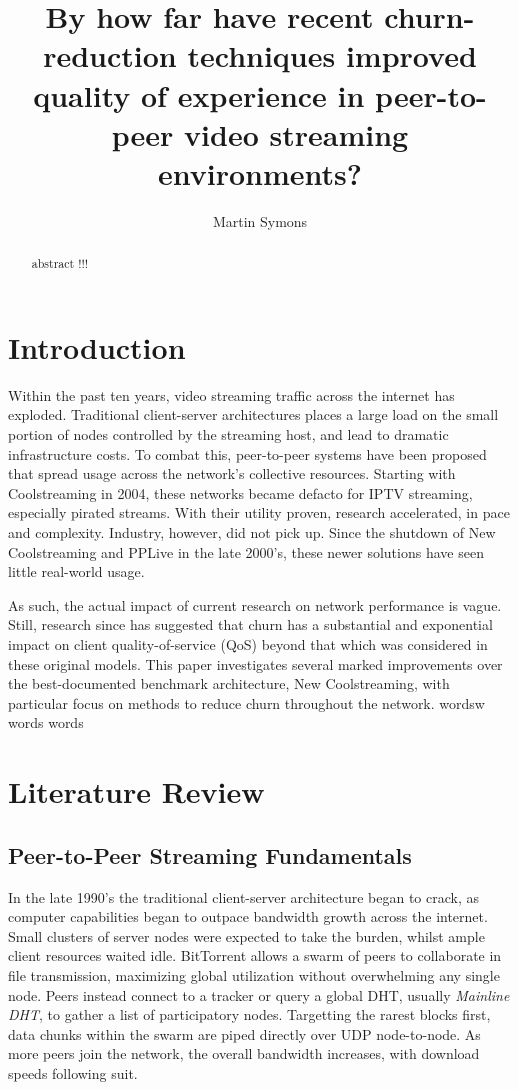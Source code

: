 \documentclass[]{article}
\title{By how far have recent churn-reduction techniques improved quality of experience in peer-to-peer video streaming environments?}
\author{Martin Symons}
\begin{document}
\maketitle

\begin{abstract}
abstract !!! 
\end{abstract}

\section{Introduction}
Within the past ten years, video streaming traffic across the internet has exploded. Traditional client-server architectures places a large load on the small portion of nodes controlled by the streaming host, and lead to dramatic infrastructure costs. To combat this, peer-to-peer systems have been proposed that spread usage across the network's collective resources. Starting with Coolstreaming in 2004, these networks became defacto for IPTV streaming, especially pirated streams. With their utility proven, research accelerated, in pace and complexity. Industry, however, did not pick up. Since the shutdown of New Coolstreaming and PPLive in the late 2000's, these newer solutions have seen little real-world usage.

As such, the actual impact of current research on network performance is vague. Still, research since has suggested that churn has a substantial and exponential impact on client quality-of-service (QoS) beyond that which was considered in these original models. This paper investigates several marked improvements over the best-documented benchmark architecture, New Coolstreaming, with particular focus on methods to reduce churn throughout the network. wordsw words words 

\section{Literature Review}
\subsection{Peer-to-Peer Streaming Fundamentals}
In the late 1990's the traditional client-server architecture began to crack, as computer capabilities began to outpace bandwidth growth across the internet. Small clusters of server nodes were expected to take the burden, whilst ample client resources waited idle. BitTorrent allows a swarm of peers to collaborate in file transmission, maximizing global utilization without overwhelming any single node. Peers instead connect to a tracker or query a global DHT, usually \textit{Mainline DHT}, to gather a list of participatory nodes. Targetting the rarest blocks first, data chunks within the swarm are piped directly over UDP node-to-node. As more peers join the network, the overall bandwidth increases, with download speeds following suit.
\end{document}
